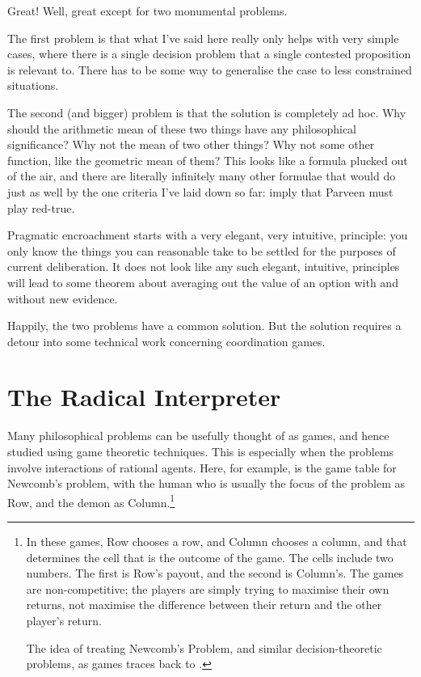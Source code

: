 \documentclass[11pt,]{book}
\let\rmarkdownfootnote\footnote%
\def\footnote{\protect\rmarkdownfootnote}
\begin{document}
Great! Well, great except for two monumental problems.

The first problem is that what I've said here really only helps with very simple cases, where there is a single decision problem that a single contested proposition is relevant to. There has to be some way to generalise the case to less constrained situations.

The second (and bigger) problem is that the solution is completely ad hoc. Why should the arithmetic mean of these two things have any philosophical significance? Why not the mean of two other things? Why not some other function, like the geometric mean of them? This looks like a formula plucked out of the air, and there are literally infinitely many other formulae that would do just as well by the one criteria I've laid down so far: imply that Parveen must play red-true.

Pragmatic encroachment starts with a very elegant, very intuitive, principle: you only know the things you can reasonable take to be settled for the purposes of current deliberation. It does not look like any such elegant, intuitive, principles will lead to some theorem about averaging out the value of an option with and without new evidence.

Happily, the two problems have a common solution. But the solution requires a detour into some technical work concerning coordination games.

\hypertarget{radicalinterpretation}{%
\section{The Radical Interpreter}\label{radicalinterpretation}}

Many philosophical problems can be usefully thought of as games, and hence studied using game theoretic techniques. This is especially when the problems involve interactions of rational agents. Here, for example, is the game table for Newcomb's problem, with the human who is usually the focus of the problem as Row, and the demon as Column.\footnote{In these games, Row chooses a row, and Column chooses a column, and that determines the cell that is the outcome of the game. The cells include two numbers. The first is Row's payout, and the second is Column's. The games are non-competitive; the players are simply trying to maximise their own returns, not maximise the difference between their return and the other player's return.

  The idea of treating Newcomb's Problem, and similar decision-theoretic problems, as games traces back to \citet{Harper1986}.}
\end{document}
